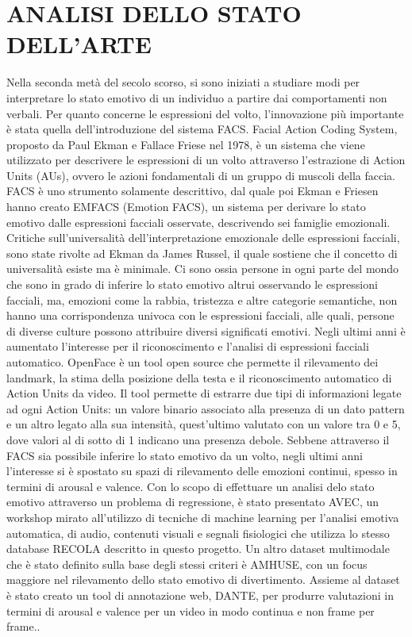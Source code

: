 \documentclass[10pt,journal,compsoc]{IEEEtran}
\begin{document}
\section{ANALISI DELLO STATO DELL'ARTE}\label{sec:statoarte}
\IEEEPARstart{}
Nella seconda metà del secolo scorso, si sono iniziati a studiare modi per interpretare lo stato emotivo di un individuo a partire dai comportamenti non verbali. Per quanto concerne le espressioni del volto, l'innovazione più importante è stata quella dell'introduzione del sistema FACS. Facial Action Coding System, proposto da Paul Ekman e Fallace Friese nel 1978, è un sistema che viene utilizzato per descrivere le espressioni di un volto attraverso l'estrazione di Action Units (AUs), ovvero le azioni fondamentali di un gruppo di muscoli della faccia\cite{ekman}. FACS è uno strumento solamente descrittivo, dal quale poi Ekman e Friesen hanno creato EMFACS (Emotion FACS), un sistema per derivare lo stato emotivo dalle espressioni facciali osservate, descrivendo sei famiglie emozionali. Critiche sull'universalità dell'interpretazione emozionale delle espressioni facciali, sono state rivolte ad Ekman da James Russel, il quale sostiene che il concetto di universalità esiste ma è minimale. Ci sono ossia persone in ogni parte del mondo che sono in grado di inferire lo stato emotivo altrui osservando le espressioni facciali, ma, emozioni come la rabbia, tristezza e altre categorie semantiche, non hanno una corrispondenza univoca con le espressioni facciali, alle quali, persone di diverse culture possono attribuire diversi significati emotivi\cite{russel}. Negli ultimi anni è aumentato l’interesse per il riconoscimento e l’analisi di espressioni facciali automatico. OpenFace è un tool open source che permette il rilevamento dei landmark, la stima della posizione della testa e il riconoscimento automatico di Action Units da video. Il tool permette di estrarre due tipi di informazioni legate ad ogni Action Units: un valore binario associato alla presenza di un dato pattern e un altro legato alla sua intensità, quest’ultimo valutato con  un valore tra 0 e 5, dove valori al di sotto di 1 indicano una presenza debole.\cite{openface}
Sebbene attraverso il FACS sia possibile inferire lo stato emotivo da un volto, negli ultimi anni l'interesse si è spostato su spazi di rilevamento delle emozioni continui, spesso in termini di arousal e valence. Con lo scopo di effettuare un analisi delo stato emotivo attraverso un problema di regressione, è stato presentato AVEC\cite{avec}, un workshop mirato all'utilizzo di tecniche di machine learning per l'analisi emotiva automatica, di audio, contenuti visuali e segnali fisiologici che utilizza lo stesso database RECOLA descritto in questo progetto.
Un altro dataset multimodale che è stato definito sulla base degli stessi criteri è AMHUSE, con un focus maggiore nel rilevamento dello stato emotivo di divertimento. Assieme al dataset è stato creato un tool di annotazione web, DANTE, per produrre valutazioni in termini di arousal e valence per un video in modo continua e non frame per frame.\cite{ahmuse}.\\
\end{document}
